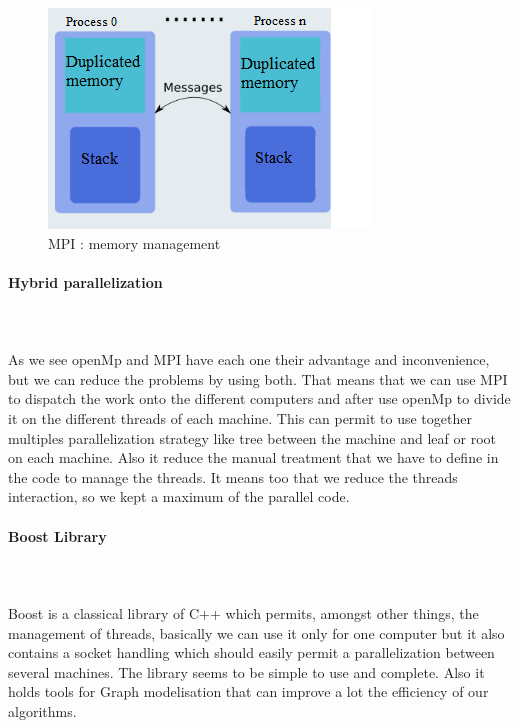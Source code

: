 \begin{figure}[!h] 
\centerline{\includegraphics[scale=0.85]{3_Software_considered/MultithreadingMP_boost_Visual_MPI_5000_Zotero_Project_Baptiste/MPI}}
   \caption{\label{étiquette} MPI : memory management}
\label{fig:MPI}
\end{figure}


\paragraph{Hybrid parallelization}\mbox{}\\\mbox{}\\

As we see openMp and MPI have each one their advantage and inconvenience, but we can reduce the problems by using both. That means that we can use MPI to dispatch the work onto the different computers and after use openMp to divide it on the different threads of each machine. This can permit to use together multiples parallelization strategy like tree between the machine and leaf or root on each machine. Also it reduce the manual treatment that we have to define in the code to manage the threads. It means too that we reduce the threads interaction, so we kept a maximum of the parallel code.

\paragraph{Boost Library}\mbox{}\\\mbox{}\\

Boost is a classical library of C++ which permits, amongst other things, the management of threads, basically we can use it only for one computer but it also contains a socket handling which should easily permit a parallelization between several machines. The library seems to be simple to use and complete. Also it holds tools for Graph modelisation that can improve a lot the efficiency of our algorithms.

